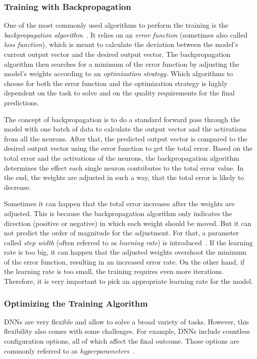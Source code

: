 \subsubsection{Training with Backpropagation}
One of the most commonly used algorithms to perform the training is the \emph{backpropagation algorithm}~\cite[pp.~151ff]{nn_intro96}. It relies on an \emph{error function} (sometimes also called \emph{loss function}), which is meant to calculate the deviation between the model's current output vector and the desired output vector. The backpropagation algorithm then searches for a minimum of the error function by adjusting the model's weights according to an \emph{optimization strategy}. Which algorithms to choose for both the error function and the optimization strategy is highly dependent on the task to solve and on the quality requirements for the final predictions.

The concept of backpropagation is to do a standard forward pass through the model with one batch of data to calculate the output vector and the activations from all the neurons. After that, the predicted output vector is compared to the desired output vector using the error function to get the total error. Based on the total error and the activations of the neurons, the backpropagation algorithm determines the effect each single neuron contributes to the total error value. In the end, the weights are adjusted in such a way, that the total error is likely to decrease.

Sometimes it can happen that the total error increases after the weights are adjusted. This is because the backpropagation algorithm only indicates the direction (positive or negative) in which each weight should be moved. But it can not predict the order of magnitude for the adjustment. For that, a parameter called \emph{step width} (often referred to as \emph{learning rate}) is introduced~\cite[p.~169]{nn_intro96}. If the learning rate is too big, it can happen that the adjusted weights overshoot the minimum of the error function, resulting in an increased error rate. On the other hand, if the learning rate is too small, the training requires even more iterations. Therefore, it is very important to pick an appropriate learning rate for the model.

\subsubsection{Optimizing the Training Algorithm}
DNNs are very flexible and allow to solve a broad variety of tasks. However, this flexibility also comes with some challenges. For example, DNNs include countless configuration options, all of which affect the final outcome. Those options are commonly referred to as \emph{hyperparameters}~\cite[pp.~270ff]{praxiseinstieg_ml17}. 

